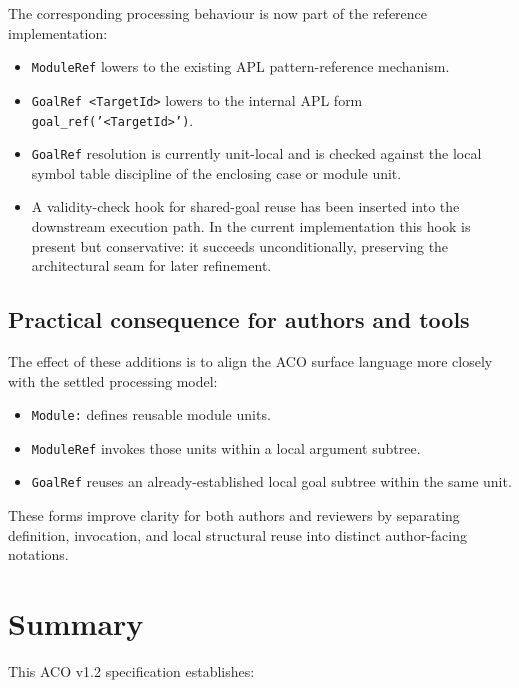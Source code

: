 \documentclass[11pt,twoside,a4paper]{article}
\begin{document}
The corresponding processing behaviour is now part of the reference implementation:
\begin{itemize}[leftmargin=2em]
  \item \texttt{ModuleRef} lowers to the existing APL pattern-reference mechanism.
  \item \texttt{GoalRef <TargetId>} lowers to the internal APL form \texttt{goal\_ref('<TargetId>')}.
  \item \texttt{GoalRef} resolution is currently unit-local and is checked against the local symbol table discipline of the enclosing case or module unit.
  \item A validity-check hook for shared-goal reuse has been inserted into the downstream execution path. In the current implementation this hook is present but conservative: it succeeds unconditionally, preserving the architectural seam for later refinement.
\end{itemize}

\subsection{Practical consequence for authors and tools}

The effect of these additions is to align the ACO surface language more closely with the settled processing model:
\begin{itemize}[leftmargin=2em]
  \item \texttt{Module:} defines reusable module units.
  \item \texttt{ModuleRef} invokes those units within a local argument subtree.
  \item \texttt{GoalRef} reuses an already-established local goal subtree within the same unit.
\end{itemize}

These forms improve clarity for both authors and reviewers by separating definition, invocation, and local structural reuse into distinct author-facing notations.


\section{Summary}

This ACO v1.2 specification establishes:
\end{document}
